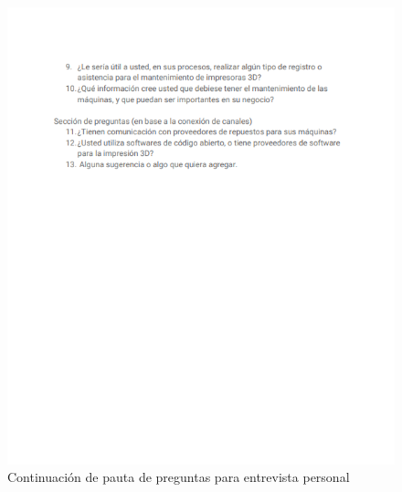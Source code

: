 \begin{figure}[H]
\centering
\includegraphics[scale=1]{images/pauta2.png}
\caption{Continuación de pauta de preguntas para entrevista personal}

\end{figure}

